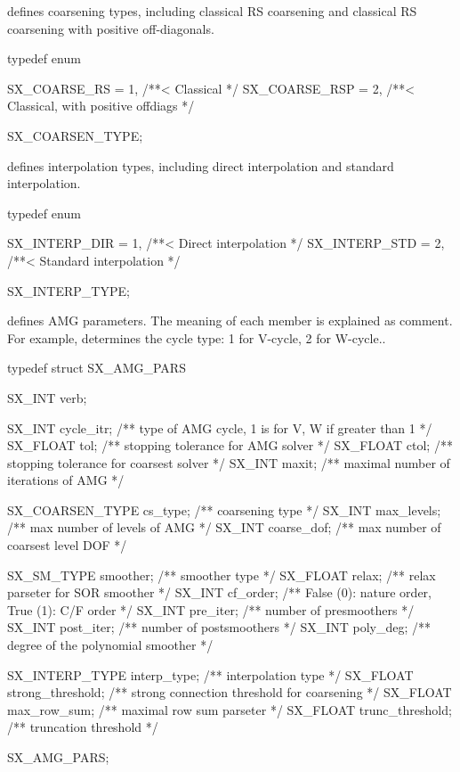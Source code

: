  defines coarsening types, including classical RS coarsening and
classical RS coarsening with positive off-diagonals.
\begin{evb}
typedef enum
{
    SX_COARSE_RS      = 1,  /**< Classical */
    SX_COARSE_RSP     = 2,  /**< Classical, with positive offdiags */

} SX_COARSEN_TYPE;
\end{evb}


 defines interpolation types, including direct interpolation
and standard interpolation.
\begin{evb}
typedef enum
{
    SX_INTERP_DIR     = 1,  /**< Direct interpolation */
    SX_INTERP_STD     = 2,  /**< Standard interpolation */

} SX_INTERP_TYPE;
\end{evb}


 defines AMG parameters. The meaning of each member is explained as comment. For example,
determines the cycle type: 1 for V-cycle, 2 for W-cycle..
\begin{evb}
typedef struct SX_AMG_PARS
{
    SX_INT verb;

    SX_INT   cycle_itr;          /** type of AMG cycle, 1 is for V, W if greater than 1 */
    SX_FLOAT tol;                /** stopping tolerance for AMG solver */
    SX_FLOAT ctol;               /** stopping tolerance for coarsest solver */
    SX_INT   maxit;              /** maximal number of iterations of AMG */

    SX_COARSEN_TYPE cs_type;     /** coarsening type */
    SX_INT max_levels;           /** max number of levels of AMG */
    SX_INT coarse_dof;           /** max number of coarsest level DOF */

    SX_SM_TYPE smoother;         /** smoother type */
    SX_FLOAT   relax;            /** relax parseter for SOR smoother */
    SX_INT     cf_order;         /** False (0): nature order, True (1): C/F order */
    SX_INT     pre_iter;         /** number of presmoothers */
    SX_INT     post_iter;        /** number of postsmoothers */
    SX_INT     poly_deg;         /** degree of the polynomial smoother */

    SX_INTERP_TYPE interp_type;  /** interpolation type */
    SX_FLOAT strong_threshold;   /** strong connection threshold for coarsening */
    SX_FLOAT max_row_sum;        /** maximal row sum parseter */
    SX_FLOAT trunc_threshold;    /** truncation threshold */

} SX_AMG_PARS;
\end{evb}

